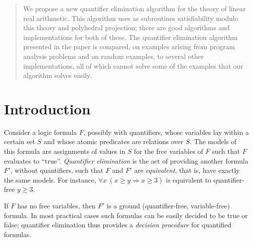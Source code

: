 \newcommand{\bbQ}{\mathbb{Q}}
\newcommand{\bbR}{\mathbb{R}}
\newcommand{\parts}[1]{\mathcal{P}(#1)}
\newcommand{\sem}[1]{\llbracket #1 \rrbracket}

\newcommand{\eabs}{\epsilon_{\text{abs}}}
\newcommand{\erel}{\epsilon_{\text{rel}}}

\newcommand{\lfp}{\text{lfp~}}

\newcommand{\abstr}[1]{#1^\sharp}

\newcommand{\definedAs}{\stackrel{\text{def}}{=}}

\renewcommand{\topfraction}{1.00}
\renewcommand{\floatpagefraction}{1.00}
\renewcommand{\textfraction}{0.00}
\renewcommand{\dbltopfraction}{1.00}
\renewcommand{\dblfloatpagefraction}{1.00}

\maketitle

\begin{abstract}
We propose a new quantifier elimination algorithm for the theory of linear real arithmetic. This algorithm uses as subroutines satisfiability modulo this theory and polyhedral projection; there are good algorithms and implementations for both of these. The quantifier elimination algorithm presented in the paper is compared, on examples arising from program analysis problems and on random examples, to several other implementations, all of which cannot solve some of the examples that our algorithm solves easily.
\end{abstract}

\sloppy

\section{Introduction}
Consider a logic formula $F$, possibly with quantifiers, whose variables lay within a certain set $S$ and whose atomic predicates are relations over $S$. The models of this formula are assignments of values in $S$ for the free variables of $F$ such that $F$ evaluates to ``true''. \emph{Quantifier elimination} is the act of providing another formula $F'$, without quantifiers, such that $F$ and $F'$ are \emph{equivalent}, that is, have exactly the same models. For instance, $\forall x~(x \geq y \Rightarrow x \geq 3)$ is equivalent to quantifier-free $y \geq 3$.

If $F$ has no free variables, then $F'$ is a ground (quantifier-free, variable-free) formula. In most practical cases such formulas can be easily decided to be true or false; quantifier elimination thus provides a \emph{decision procedure} for quantified formulas.

